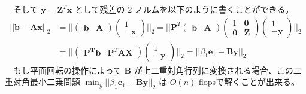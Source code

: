 \documentclass[dvipdfmx,10pt,presentation]{beamer}
\begin{document}
\begin{frame}[label={sec:orgafc6840}]{}
　そして \(\bm{y} = \bm{Z}^T\bm{x}\) として残差の 2 ノルムを以下のように書くことができる。\\
\begin{align*}
||\bm{b} - \bm{A}\bm{x}||_2 &=
|| \begin{pmatrix}
\bm{b} & \bm{A}
\end{pmatrix}
\begin{pmatrix}
1 \\
-\bm{x}
\end{pmatrix}||_2 = 
||
\bm{P}^T
\begin{pmatrix}
\bm{b} & \bm{A}
\end{pmatrix}
\begin{pmatrix}
1 & \bm{0} \\
\bm{0} & \bm{Z}
\end{pmatrix}
\begin{pmatrix}
1 \\ - \bm{y}
\end{pmatrix}
||_2 \\
&= ||
\begin{pmatrix}
\bm{\bm{P}^T\bm{b}} & \bm{P}^T\bm{A}\bm{X}
\end{pmatrix}
\begin{pmatrix}
1 \\
-\bm{y}
\end{pmatrix}
||_2 =
|| \beta_1\bm{e}_1 - \bm{B}\bm{y}||_2 \tag{7.8}
\end{align*}
　もし平面回転の操作によって \(\bm{B}\) が上二重対角行列に変換される場合、この二重対角最小二乗問題 \(\min_y||\beta_1\bm{e}_1 - \bm{B}\bm{y}||_2\) は \(O(n)\) flopsで解くことが出来る。\\
\end{frame}
\end{document}

